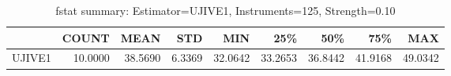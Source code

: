\begin{table}[ht]
\centering
\caption{fstat summary: Estimator=UJIVE1, Instruments=125, Strength=0.10}
\begin{tabular}{lrrrrrrrr}
\toprule
 & COUNT & MEAN & STD & MIN & 25\% & 50\% & 75\% & MAX \\
\midrule
UJIVE1 & 10.0000 & 38.5690 & 6.3369 & 32.0642 & 33.2653 & 36.8442 & 41.9168 & 49.0342 \\
\bottomrule
\end{tabular}
\end{table}
